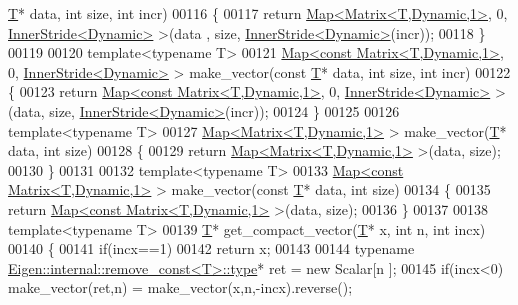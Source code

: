 \begin{DoxyCode}
      \hyperlink{group___sparse_core___module}{T}* data, \textcolor{keywordtype}{int} size, \textcolor{keywordtype}{int} incr)
00116 \{
00117   \textcolor{keywordflow}{return} \hyperlink{group___core___module_class_eigen_1_1_map}{Map<Matrix<T,Dynamic,1>}, 0, \hyperlink{class_eigen_1_1_inner_stride}{InnerStride<Dynamic>} >(data
      , size, \hyperlink{class_eigen_1_1_inner_stride}{InnerStride<Dynamic>}(incr));
00118 \}
00119 
00120 \textcolor{keyword}{template}<\textcolor{keyword}{typename} T>
00121 \hyperlink{group___core___module_class_eigen_1_1_map}{Map<const Matrix<T,Dynamic,1>}, 0, 
      \hyperlink{class_eigen_1_1_inner_stride}{InnerStride<Dynamic>} > make\_vector(\textcolor{keyword}{const} \hyperlink{group___sparse_core___module}{T}* data, \textcolor{keywordtype}{int} size, \textcolor{keywordtype}{int} incr)
00122 \{
00123   \textcolor{keywordflow}{return} \hyperlink{group___core___module_class_eigen_1_1_map}{Map<const Matrix<T,Dynamic,1>}, 0, 
      \hyperlink{class_eigen_1_1_inner_stride}{InnerStride<Dynamic>} >(data, size, \hyperlink{class_eigen_1_1_inner_stride}{InnerStride<Dynamic>}(incr));
00124 \}
00125 
00126 \textcolor{keyword}{template}<\textcolor{keyword}{typename} T>
00127 \hyperlink{group___core___module_class_eigen_1_1_map}{Map<Matrix<T,Dynamic,1>} > make\_vector(\hyperlink{group___sparse_core___module}{T}* data, \textcolor{keywordtype}{int} size)
00128 \{
00129   \textcolor{keywordflow}{return} \hyperlink{group___core___module_class_eigen_1_1_map}{Map<Matrix<T,Dynamic,1>} >(data, size);
00130 \}
00131 
00132 \textcolor{keyword}{template}<\textcolor{keyword}{typename} T>
00133 \hyperlink{group___core___module_class_eigen_1_1_map}{Map<const Matrix<T,Dynamic,1>} > make\_vector(\textcolor{keyword}{const} \hyperlink{group___sparse_core___module}{T}* data, \textcolor{keywordtype}{int} size)
00134 \{
00135   \textcolor{keywordflow}{return} \hyperlink{group___core___module_class_eigen_1_1_map}{Map<const Matrix<T,Dynamic,1>} >(data, size);
00136 \}
00137 
00138 \textcolor{keyword}{template}<\textcolor{keyword}{typename} T>
00139 \hyperlink{group___sparse_core___module}{T}* get\_compact\_vector(\hyperlink{group___sparse_core___module}{T}* x, \textcolor{keywordtype}{int} n, \textcolor{keywordtype}{int} incx)
00140 \{
00141   \textcolor{keywordflow}{if}(incx==1)
00142     \textcolor{keywordflow}{return} x;
00143 
00144   \textcolor{keyword}{typename} \hyperlink{group___sparse_core___module}{Eigen::internal::remove\_const<T>::type}* ret = \textcolor{keyword}{new} Scalar[n
      ];
00145   \textcolor{keywordflow}{if}(incx<0) make\_vector(ret,n) = make\_vector(x,n,-incx).reverse();

\end{DoxyCode}
